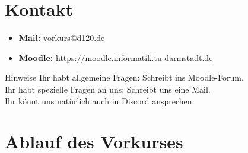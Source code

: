 \section{Kontakt}
\begin{frame}
    \slidehead
    \begin{itemize}
        \item \textbf{Mail:} \href{mailto:vorkurs@d120.de}{vorkurs@d120.de}
        \item \textbf{Moodle:}  \href{https://moodle.informatik.tu-darmstadt.de/course/view.php?id=624} {https://moodle.informatik.tu-darmstadt.de}
    \end{itemize}
    \vspace{2.5cm}
    \begin{alertblock}{Hinweise}
        Ihr habt allgemeine Fragen: Schreibt ins Moodle-Forum. \\
        Ihr habt spezielle Fragen an uns: Schreibt uns eine Mail. \\
        Ihr könnt uns natürlich auch in Discord ansprechen.
    \end{alertblock}
\end{frame}

\section{Ablauf des Vorkurses}
